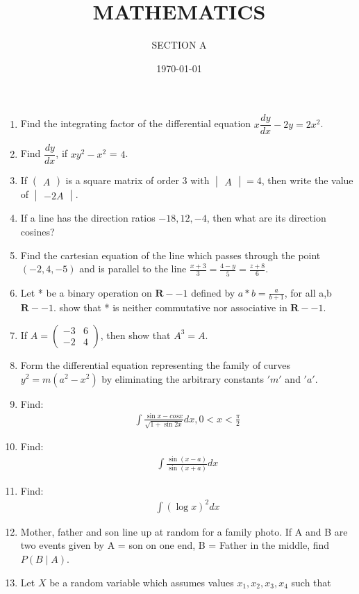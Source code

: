 \documentclass[10pt,-letter paper]{article}
\title{MATHEMATICS}
\author{SECTION A}
\date{\today}
\let\vec\mathbf{}
\let\vec\mathbf{}
\let\vec\mathbf{}
\providecommand{\brak}[1]{\ensuremath{\left(#1\right)}}
\newcommand{\myvec}[1]{\ensuremath{\begin{pmatrix}#1\end{pmatrix}}}
\newcommand{\mydet}[1]{\ensuremath{\begin{vmatrix}#1\end{vmatrix}}}
\begin{document}
\maketitle

\begin{enumerate}
\item Find the integrating factor of the differential equation ${x}\dfrac{dy}{dx}-2{y} = 2{x}^2$.
\item Find $\dfrac{dy}{dx}$, if ${x}{y}^2-{x}^2$ = $4$.
\item If \myvec{A} is a square matrix of order $3$ with $\mydet{A} = 4$, then write the value of $\mydet{-2A}$.
\item If a line has the direction ratios ${-18,12,-4}$, then what are its direction cosines?
\item Find the cartesian equation of the line which passes through the point $\brak{-2,4,-5}$ and is parallel to the line $\frac{{x} + {3}}{3} = \frac{{4} - {y}}{5} = \frac{{z} + {8}}{6}$.
\item Let * be a binary operation on $\vec{R}-{-1}$ defined by $a * b = \frac{a}{{b} + {1}}$, for all a,b \in $\vec{R}-{-1}$. show that * is neither commutative nor associative in $\vec{R}-{-1}$.
\item If $A=\myvec{ -3 & 6 \\ -2 & 4}$, then show that ${A}^3=A$.
\item Form the differential equation representing the family of curves ${y}^2 = m\brak{{a}^2-{x}^2}$ by eliminating the arbitrary constants $'m'$ and $'a'$.
\item Find: 
	\begin{align*}
		\int\frac{\sin x-cos x}{\sqrt{1+\sin 2x}}dx, 0<x<\frac{\pi}{2}
	\end{align*}
\item Find: 
	\begin{align*}
		\int\frac{\sin\brak{x-a}}{\sin\brak{x+a}}dx
	\end{align*}
\item Find:
	\begin{align*}
	\int\brak{\log{x}}^2dx
        \end{align*}
\item Mother, father and son line up at random for a family photo. If A and B are two events given by A = son on one end, B = Father in the middle, find $P(B\mid A)$.
\item Let ${X}$ be a random variable which assumes values ${x_1},{x_2},{x_3},{x_4}$ such that
	\begin{align*}

\end{align*}
\end{enumerate}
\end{document}
